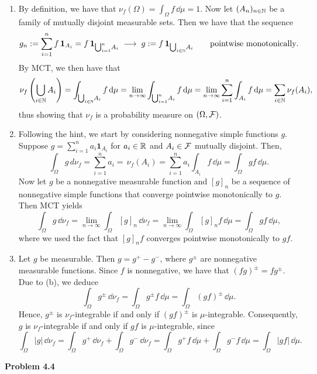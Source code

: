 \begin{enumerate}[label={(\alph*)}]
	\item By definition, we have that $\nu_f(\Omega) = \int_\Omega f\,\dd\mu = 1$. Now let $(A_n)_{n\in\mathbb N}$ be a family of mutually disjoint measurable sets. Then we have that the sequence 
	\[
		g_n:= \sum_{i=1}^n f\,\mathbf{1}_{A_i} = f\,\mathbf{1}_{\bigcup_{i=1}^n\! A_i}\;\longrightarrow\; g:= f\,\mathbf{1}_{\bigcup_{i\in\mathbb N}\! A_i}\qquad\text{pointwise monotonically}.
	\]
	By MCT, we then have that
	\[
		\nu_f\left(\bigcup_{i\in\mathbb N} A_i\right) = \int_{\bigcup_{i\in\mathbb N}\! A_i} f\,\mathrm{d}\mu = \lim_{n\to\infty} \int_{\bigcup_{i=1}^n\! A_i} f\,\mathrm{d}\mu = \lim_{n\to\infty} \sum_{i=1}^n \int_{A_i} f\,\mathrm{d}\mu = \sum_{i\in\mathbb N}\nu_f(A_i),
	\]
	thus showing that $\nu_f$ is a probability measure on $(\Omega,\mathcal F)$.
	
	\item Following the hint, we start by considering nonnegative simple functions $g$. Suppose $g=\sum_{i=1}^n a_i \mathbf{1}_{A_i}$ for $a_i\in\mathbb R$ and $A_i\in\mathcal F$ mutually disjoint. Then,
	\[
		\int_\Omega g\,d\nu_f = \sum_{i=1}^n a_i =\,\nu_f(A_i) = \sum_{i=1}^n a_i\int_{A_i} f\,\dd\mu = \int_\Omega gf\,\dd\mu.
	\]
	Now let $g$ be a nonnegative measurable function and $[g]_n$ be a sequence of nonnegative simple functions that converge pointwise monotonically to $g$. Then MCT yields
	\[
		\int_\Omega g\,\dd\nu_f = \lim_{n\to\infty}\int_\Omega [g]_n\,\dd\nu_f = \lim_{n\to\infty} \int_\Omega [g]_n f\,\dd\mu = \int_\Omega gf\,\dd\mu,
	\]
	where we used the fact that $[g]_n f$ converges pointwise monotonically to $gf$.
	
	\item Let $g$ be measurable. Then $g=g^+-g^-$, where $g^\pm$ are nonnegative measurable functions. Since $f$ is nonnegative, we have that $(fg)^\pm = f g^\pm$. Due to (b), we deduce
	\[
		\int_\Omega g^\pm\,\dd\nu_f = \int_\Omega g^\pm f\,\dd\mu = \int_\Omega (gf)^\pm\,\dd\mu.
	\]
	Hence, $g^\pm$ is $\nu_f$-integrable if and only if $(gf)^\pm$ is $\mu$-integrable. Consequently, $g$ is $\nu_f$-integrable if and only if $gf$ is $\mu$-integrable, since
	\[
		\int_\Omega |g|\,\dd\nu_f = \int_\Omega g^+\,\dd\nu_f + \int_\Omega g^-\,\dd\nu_f = \int_\Omega g^+f\,\dd\mu + \int_\Omega g^-f\,\dd\mu = \int_\Omega |gf|\,\dd\mu.
	\]
\end{enumerate}

\bigskip
\textbf{Problem 4.4}

